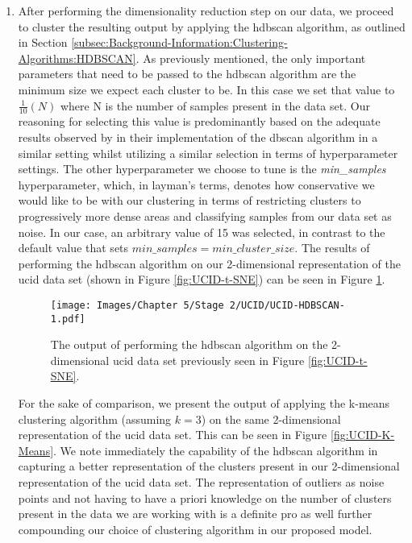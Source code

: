\begin{adjustwidth}{-1.65cm}{-0.0cm}
\begin{enumerate}[label=Step 2.\arabic*:, leftmargin=*]
        \item After performing the dimensionality reduction step on our data, we proceed to cluster the resulting output by applying the \gls{hdbscan} algorithm, as outlined in Section \ref{subsec:Background-Information:Clustering-Algorithms:HDBSCAN}. As previously mentioned, the only important parameters that need to be passed to the \gls{hdbscan} algorithm are the minimum size we expect each cluster to be. In this case we set that value to $\frac{1}{10}\left(N\right)$ where N is the number of samples present in the data set. Our reasoning for selecting this value is predominantly based on the adequate results observed by \citet{Kong} in their implementation of the \gls{dbscan} algorithm in a similar setting whilst utilizing a similar selection in terms of hyperparameter settings. The other hyperparameter we choose to tune is the \textit{min\_samples} hyperparameter, which, in layman's terms, denotes how conservative we would like to be with our clustering in terms of restricting clusters to progressively more dense areas and classifying samples from our data set as noise. In our case, an arbitrary value of 15 was selected, in contrast to the default value that sets $min\_samples = min\_cluster\_size$. The results of performing the \gls{hdbscan} algorithm on our 2-dimensional representation of the \gls{ucid} data set (shown in Figure \ref{fig:UCID-t-SNE}) can be seen in Figure \ref{fig:UCID-HDBSCAN-1}.
        
        \begin{figure}[H]
            \centering
            \texttt{[image: Images/Chapter 5/Stage 2/UCID/UCID-HDBSCAN-1.pdf]}
            \caption{The output of performing the \gls{hdbscan} algorithm on the 2-dimensional \gls{ucid} data set previously seen in Figure \ref{fig:UCID-t-SNE}.}
            \label{fig:UCID-HDBSCAN-1}
        \end{figure}
        
        \noindent \newline For the sake of comparison, we present the output of applying the k-means clustering algorithm (assuming $k = 3$) on the same 2-dimensional representation of the \gls{ucid} data set. This can be seen in Figure \ref{fig:UCID-K-Means}. We note immediately the capability of the \gls{hdbscan} algorithm in capturing a better representation of the clusters present in our 2-dimensional representation of the \gls{ucid} data set. The representation of outliers as noise points and not having to have a priori knowledge on the number of clusters present in the data we are working with is a definite pro as well further compounding our choice of clustering algorithm in our proposed model.
        

\end{enumerate}
\end{adjustwidth}
